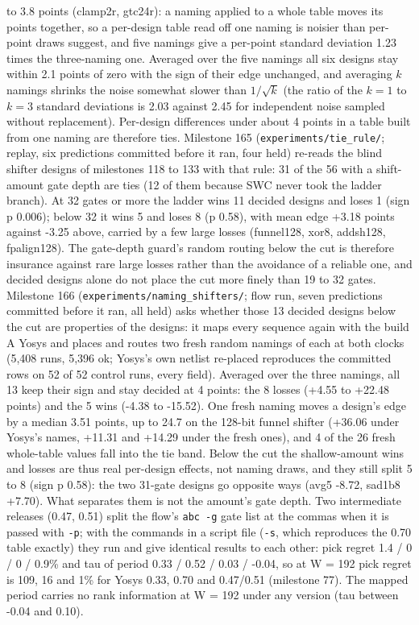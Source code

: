\documentclass[conference]{IEEEtran}
\begin{document}
to 3.8 points (clamp2r, gtc24r): a naming applied to a whole table moves
its points together, so a per-design table read off one naming is
noisier than per-point draws suggest, and five namings give a per-point
standard deviation 1.23 times the three-naming one. Averaged over the
five namings all six designs stay within 2.1 points of zero with the
sign of their edge unchanged, and averaging \(k\) namings shrinks the
noise somewhat slower than \(1/\sqrt{k}\) (the ratio of the \(k = 1\) to
\(k = 3\) standard deviations is 2.03 against 2.45 for independent noise
sampled without replacement). Per-design differences under about 4
points in a table built from one naming are therefore ties. Milestone
165 (\texttt{experiments/\allowbreak{}tie\_\allowbreak{}rule/\allowbreak{}}; replay, six predictions committed
before it ran, four held) re-reads the blind shifter designs of
milestones 118 to 133 with that rule: 31 of the 56 with a shift-amount
gate depth are ties (12 of them because SWC never took the ladder
branch). At 32 gates or more the ladder wins 11 decided designs and
loses 1 (sign p 0.006); below 32 it wins 5 and loses 8 (p 0.58), with
mean edge +3.18 points against -3.25 above, carried by a few large
losses (funnel128, xor8, addsh128, fpalign128). The gate-depth guard's
random routing below the cut is therefore insurance against rare large
losses rather than the avoidance of a reliable one, and decided designs
alone do not place the cut more finely than 19 to 32 gates. Milestone
166 (\texttt{experiments/\allowbreak{}naming\_\allowbreak{}shifters/\allowbreak{}}; flow run, seven predictions
committed before it ran, all held) asks whether those 13 decided designs
below the cut are properties of the designs: it maps every sequence
again with the build A Yosys and places and routes two fresh random
namings of each at both clocks (5,408 runs, 5,396 ok; Yosys's own
netlist re-placed reproduces the committed rows on 52 of 52 control
runs, every field). Averaged over the three namings, all 13 keep their
sign and stay decided at 4 points: the 8 losses (+4.55 to +22.48 points)
and the 5 wins (-4.38 to -15.52). One fresh naming moves a design's edge
by a median 3.51 points, up to 24.7 on the 128-bit funnel shifter
(+36.06 under Yosys's names, +11.31 and +14.29 under the fresh ones),
and 4 of the 26 fresh whole-table values fall into the tie band. Below
the cut the shallow-amount wins and losses are thus real per-design
effects, not naming draws, and they still split 5 to 8 (sign p 0.58):
the two 31-gate designs go opposite ways (avg5 -8.72, sad1b8 +7.70).
What separates them is not the amount's gate depth. Two intermediate
releases (0.47, 0.51) split the flow's \texttt{abc\ -g} gate list at the
commas when it is passed with \texttt{-p}; with the commands in a script
file (\texttt{-s}, which reproduces the 0.70 table exactly) they run and
give identical results to each other: pick regret 1.4 / 0 / 0 / 0.9\%
and tau of period 0.33 / 0.52 / 0.03 / -0.04, so at W = 192 pick regret
is 109, 16 and 1\% for Yosys 0.33, 0.70 and 0.47/0.51 (milestone 77).
The mapped period carries no rank information at W = 192 under any
version (tau between -0.04 and 0.10).
\end{document}
